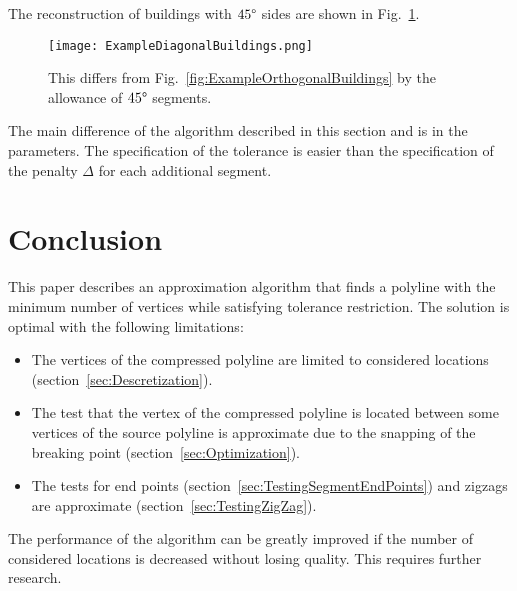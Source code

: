 \documentclass[conference]{IEEEtran}
\begin{document}
The reconstruction of buildings with $45 \degree$ sides are shown in Fig.~\ref{fig:Example45DegreeBuildings}.

\begin{figure} [htb]
  \centering
    \texttt{[image: ExampleDiagonalBuildings.png]}
  \caption
  {
    This differs from Fig.~\ref{fig:ExampleOrthogonalBuildings} by the allowance of $45 \degree$ segments.
  }
  \label{fig:Example45DegreeBuildings}
\end{figure}

The main difference of the algorithm described in this section and \cite{ReconstructionOfOrthogonalPolygonalLines} is in the parameters. The specification of the tolerance is easier than the specification of the penalty $\Delta$ for each additional segment.

\section{Conclusion}

This paper describes an approximation algorithm that finds a polyline with the minimum number of vertices while satisfying tolerance restriction. The solution is optimal with the following limitations:
\begin{itemize}
  \item The vertices of the compressed polyline are limited to considered locations (section~\ref{sec:Descretization}).
  \item The test that the vertex of the compressed polyline is located between some vertices of the source polyline is approximate due to the snapping of the breaking point (section~\ref{sec:Optimization}).
  \item The tests for end points (section~\ref{sec:TestingSegmentEndPoints}) and zigzags are approximate (section~\ref{sec:TestingZigZag}).
\end{itemize}

The performance of the algorithm can be greatly improved if the number of considered locations is decreased without losing quality. This requires further research.

\newcommand{\doi}[1]{\textsc{doi}: \href{http://dx.doi.org/#1}{\nolinkurl{#1}}}



\begingroup
\raggedright


\endgroup
\end{document}
